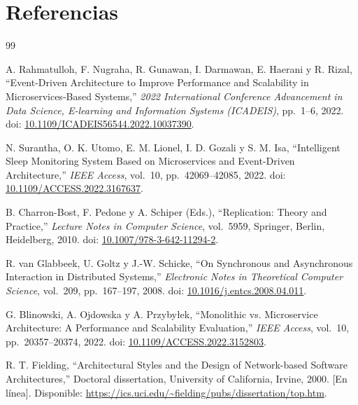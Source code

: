 \documentclass[12pt,a4paper]{article}
\begin{document}
\newpage
\section*{Referencias}
 
\begin{thebibliography}{99}
 
A. Rahmatulloh, F. Nugraha, R. Gunawan, I. Darmawan, E. Haerani y R. Rizal,
``Event-Driven Architecture to Improve Performance and Scalability in Microservices-Based Systems,''
\textit{2022 International Conference Advancement in Data Science, E-learning and Information Systems (ICADEIS)},
pp.~1--6, 2022.
doi: \href{https://doi.org/10.1109/ICADEIS56544.2022.10037390}{10.1109/ICADEIS56544.2022.10037390}.
 
N. Surantha, O. K. Utomo, E. M. Lionel, I. D. Gozali y S. M. Isa,
``Intelligent Sleep Monitoring System Based on Microservices and Event-Driven Architecture,''
\textit{IEEE Access},
vol.~10, pp.~42069--42085, 2022.
doi: \href{https://doi.org/10.1109/ACCESS.2022.3167637}{10.1109/ACCESS.2022.3167637}.
 
B. Charron-Bost, F. Pedone y A. Schiper (Eds.),
``Replication: Theory and Practice,''
\textit{Lecture Notes in Computer Science}, vol.~5959,
Springer, Berlin, Heidelberg, 2010.
doi: \href{https://doi.org/10.1007/978-3-642-11294-2}{10.1007/978-3-642-11294-2}.
 
R. van Glabbeek, U. Goltz y J.-W. Schicke,
``On Synchronous and Asynchronous Interaction in Distributed Systems,''
\textit{Electronic Notes in Theoretical Computer Science},
vol.~209, pp.~167--197, 2008.
doi: \href{https://doi.org/10.1016/j.entcs.2008.04.011}{10.1016/j.entcs.2008.04.011}.
 
G. Blinowski, A. Ojdowska y A. Przybyłek,
``Monolithic vs. Microservice Architecture: A Performance and Scalability Evaluation,''
\textit{IEEE Access},
vol.~10, pp.~20357--20374, 2022.
doi: \href{https://doi.org/10.1109/ACCESS.2022.3152803}{10.1109/ACCESS.2022.3152803}.
 
R. T. Fielding,
``Architectural Styles and the Design of Network-based Software Architectures,''
Doctoral dissertation, University of California, Irvine, 2000.
[En línea]. Disponible: \url{https://ics.uci.edu/~fielding/pubs/dissertation/top.htm}.
 

\end{thebibliography}
\end{document}
